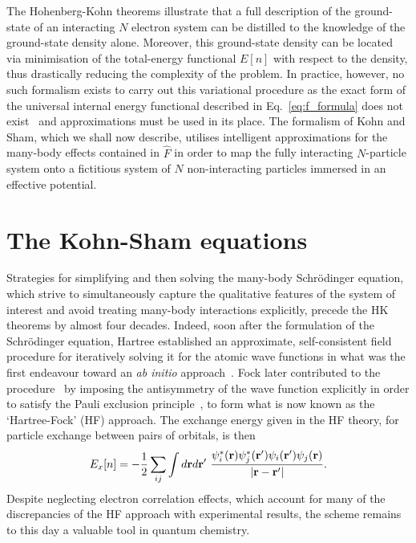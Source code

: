 The Hohenberg-Kohn theorems illustrate 
that a full description of the ground-state 
of an interacting $N$ electron system  
can be distilled to the knowledge 
of the ground-state density alone.
%
Moreover, this ground-state density 
can be located via  minimisation 
of the total-energy functional $E[n]$ 
with respect to the density, 
thus drastically reducing 
the complexity of the problem. 
%
In practice, however, 
no such formalism exists to carry out 
this variational procedure 
as the exact form of 
the universal internal energy functional 
described in Eq.~\eqref{eq:f_formula} 
does not exist~\cite{CAPELLE2006} 
and approximations 
must be used in its place.
%
The formalism of Kohn and Sham, 
which we shall now describe, 
utilises intelligent approximations for 
the many-body effects contained in $\hat{F}$ 
in order to map the fully interacting $N$-particle system  
onto a fictitious system of $N$ non-interacting 
particles immersed in an effective potential.


\section{The Kohn-Sham equations}
\label{sec:kohn_sham_equations}

{Strategies for simplifying 
and then solving the many-body 
Schr\"{o}dinger equation},  
which strive to simultaneously capture  
the qualitative features of the system of interest 
and avoid treating many-body interactions explicitly, 
precede the HK theorems by almost four decades.
%
Indeed, 
soon after the formulation 
of the Schr{\"o}dinger equation, 
Hartree established an approximate, 
self-consistent field procedure 
for iteratively solving it 
for the atomic wave functions  
in what was the first endeavour toward 
an \emph{ab initio} approach~\cite{hartree_1928}.
%
Fock later contributed to the 
procedure~\cite{Fock1930,PhysRev.35.210.2} 
by imposing the antisymmetry 
of the wave function explicitly 
in order to satisfy the Pauli exclusion principle~\cite{PhysRev.58.716}, 
to form what is now known 
as the `Hartree-Fock' (HF) approach.
%
The exchange energy 
given in the HF theory, 
for particle exchange  
between pairs of orbitals, 
is then 
%
\begin{equation}
E_x[n]=-\frac{1}{2}\sum_{ij}\int d\br d{\bf r'}\ \frac{\psi_i^*(\br)\psi_j^*({\bf r'})\psi_i({\bf r'})\psi_j(\br)}{|{\bf r-r'}|}.
\label{eq:exact_exchange}
\end{equation}
%
Despite neglecting electron correlation effects, 
{which account for many of the 
discrepancies of the HF approach with experimental results, 
the scheme} remains to this day 
a valuable tool in quantum chemistry.
 
